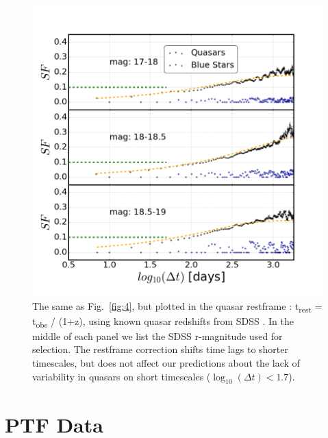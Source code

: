 \documentclass[fleqn,usenatbib]{mnras}  %
\begin{document}
\begin{figure}
\label{fig:5}
 \includegraphics[width=1.15\columnwidth, center]{Fig_5_SF_QSO_starsB_r_cut_rest.png}
 \caption{The same as Fig.~\ref{fig:4}, but plotted in the quasar restframe : t\textsubscript{rest} = t\textsubscript{obs} / (1+z), using known quasar redshifts from SDSS \citep{macleod2010}.   In the middle of each panel we list the SDSS r-magnitude used for selection. The restframe correction shifts time lags to shorter timescales, but does not affect our predictions about the lack of variability in quasars on short timescales ($\log_{10}(\Delta t) < 1.7$).} %
\end{figure}



\section{PTF Data}
\end{document}
